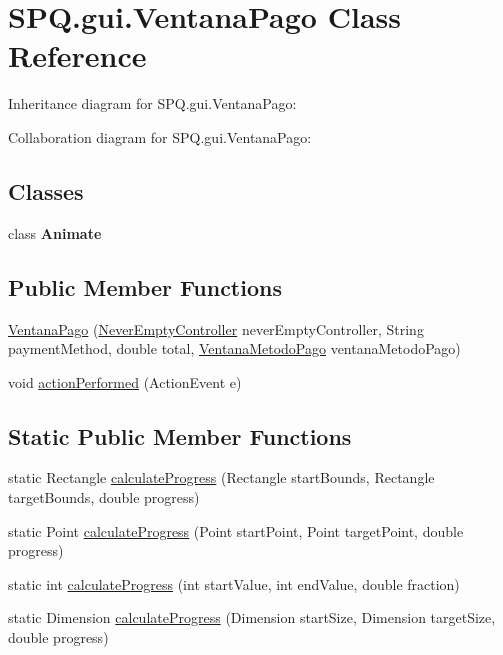 \hypertarget{class_s_p_q_1_1gui_1_1_ventana_pago}{}\section{S\+P\+Q.\+gui.\+Ventana\+Pago Class Reference}
\label{class_s_p_q_1_1gui_1_1_ventana_pago}


Inheritance diagram for S\+P\+Q.\+gui.\+Ventana\+Pago\+:


Collaboration diagram for S\+P\+Q.\+gui.\+Ventana\+Pago\+:
\subsection*{Classes}
\begin{DoxyCompactItemize}
\item 
class {\bfseries Animate}
\end{DoxyCompactItemize}
\subsection*{Public Member Functions}
\begin{DoxyCompactItemize}
\item 
\mbox{\hyperlink{class_s_p_q_1_1gui_1_1_ventana_pago_ac192c8e330c672202608380ffaabd275}{Ventana\+Pago}} (\mbox{\hyperlink{class_s_p_q_1_1controller_1_1_never_empty_controller}{Never\+Empty\+Controller}} never\+Empty\+Controller, String payment\+Method, double total, \mbox{\hyperlink{class_s_p_q_1_1gui_1_1_ventana_metodo_pago}{Ventana\+Metodo\+Pago}} ventana\+Metodo\+Pago)
\item 
void \mbox{\hyperlink{class_s_p_q_1_1gui_1_1_ventana_pago_a64947ae1b81ff8e561792d9db382b1f9}{action\+Performed}} (Action\+Event e)
\end{DoxyCompactItemize}
\subsection*{Static Public Member Functions}
\begin{DoxyCompactItemize}
\item 
static Rectangle \mbox{\hyperlink{class_s_p_q_1_1gui_1_1_ventana_pago_ab3583b9bfd461ce0bede2df8ea8c7bd1}{calculate\+Progress}} (Rectangle start\+Bounds, Rectangle target\+Bounds, double progress)
\item 
static Point \mbox{\hyperlink{class_s_p_q_1_1gui_1_1_ventana_pago_aebf84331e3789dfd9444704d43ee3104}{calculate\+Progress}} (Point start\+Point, Point target\+Point, double progress)
\item 
static int \mbox{\hyperlink{class_s_p_q_1_1gui_1_1_ventana_pago_aa815284e8b31df848f8801518cf95c95}{calculate\+Progress}} (int start\+Value, int end\+Value, double fraction)
\item 
static Dimension \mbox{\hyperlink{class_s_p_q_1_1gui_1_1_ventana_pago_a40ab2ece25e6d7c17d9704d5172be76c}{calculate\+Progress}} (Dimension start\+Size, Dimension target\+Size, double progress)
\end{DoxyCompactItemize}
